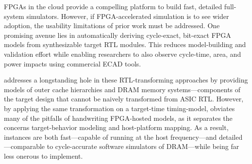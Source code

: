 FPGAs in the cloud provide a compelling platform to build fast, detailed
full-system simulators. However, if FPGA-accelerated simulation is to see wider
adoption, the usability limitations of prior work must be addressed.  One
promising avenue lies in automatically deriving cycle-exact, bit-exact FPGA
models from synthesizable target RTL modules. This reduces model-building and
validation effort while enabling researchers to also observe cycle-time, area,
and power impacts using commercial ECAD tools.

\PNAME addresses a longstanding hole in these RTL-transforming approaches by
providing models of outer cache hierarchies and DRAM memory systems---components
of the target design that cannot be naively transformed from ASIC
RTL.  However, by applying the same transformation on a target-time
timing-model, \PNAME obviates many of the pitfalls of handwriting FPGA-hosted
models, as it separates the concerns target-behavior modeling and
host-platform mapping. As a result, \PNAME instances are both fast---capable
of running at the host frequency---and detailed---comparable to
cycle-accurate software simulators of DRAM---while being far less onerous
to implement.
